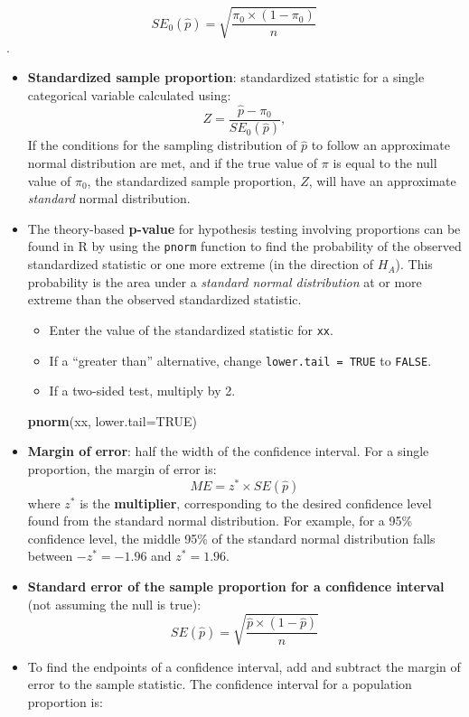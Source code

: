 \documentclass[
]{report}
\newenvironment{Shaded}{\begin{snugshade}}{\end{snugshade}}
\newcommand{\AttributeTok}[1]{\textcolor[rgb]{0.13,0.29,0.53}{#1}}
\newcommand{\ConstantTok}[1]{\textcolor[rgb]{0.56,0.35,0.01}{#1}}
\newcommand{\FunctionTok}[1]{\textcolor[rgb]{0.13,0.29,0.53}{\textbf{#1}}}
\newcommand{\NormalTok}[1]{#1}
\begin{document}
\[SE_0(\hat{p})=\sqrt{\frac{\pi_0\times(1-\pi_0)}{n}}\].

\begin{itemize}
\item
  \textbf{Standardized sample proportion}: standardized statistic for a single categorical variable calculated using:
  \[
  Z = \frac{\hat{p} - \pi_0}{SE_0(\hat{p})},
  \]
  If the conditions for the sampling distribution of \(\hat{p}\) to follow an approximate normal distribution are met, and if the true value of \(\pi\) is equal to the null value of \(\pi_0\), the standardized sample proportion, \(Z\), will have an approximate \emph{standard} normal distribution.
\item
  The theory-based \textbf{p-value} for hypothesis testing involving proportions can be found in R by using the \texttt{pnorm} function to find the probability of the observed standardized statistic or one more extreme (in the direction of \(H_A\)). This probability is the area under a \emph{standard normal distribution} at or more extreme than the observed standardized statistic.

  \begin{itemize}
  \item
    Enter the value of the standardized statistic for \texttt{xx}.
  \item
    If a ``greater than'' alternative, change \texttt{lower.tail\ =\ TRUE} to \texttt{FALSE}.
  \item
    If a two-sided test, multiply by 2.
  \end{itemize}

\begin{Shaded}
\begin{Highlighting}[]
\FunctionTok{pnorm}\NormalTok{(xx, }\AttributeTok{lower.tail=}\ConstantTok{TRUE}\NormalTok{)}
\end{Highlighting}
\end{Shaded}
\item
  \textbf{Margin of error}: half the width of the confidence interval. For a single proportion, the margin of error is:
  \[ME = z^* \times SE(\hat{p})\]
  where \(z^*\) is the \textbf{multiplier}, corresponding to the desired confidence level found from the standard normal distribution. For example, for a 95\% confidence level, the middle 95\% of the standard normal distribution falls between \(-z^*=-1.96\) and \(z^*=1.96\).
\item
  \textbf{Standard error of the sample proportion for a confidence interval} (not assuming the null is true):
  \[SE(\hat{p}) = \sqrt{\frac{\hat{p}\times (1-\hat{p})}{n}}\]
\item
  To find the endpoints of a confidence interval, add and subtract the margin of error to the sample statistic. The confidence interval for a population proportion is:
\end{itemize}
\end{document}
